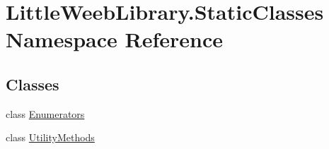\hypertarget{namespace_little_weeb_library_1_1_static_classes}{}\section{Little\+Weeb\+Library.\+Static\+Classes Namespace Reference}
\label{namespace_little_weeb_library_1_1_static_classes}
\subsection*{Classes}
\begin{DoxyCompactItemize}
\item 
class \mbox{\hyperlink{class_little_weeb_library_1_1_static_classes_1_1_enumerators}{Enumerators}}
\item 
class \mbox{\hyperlink{class_little_weeb_library_1_1_static_classes_1_1_utility_methods}{Utility\+Methods}}
\end{DoxyCompactItemize}
